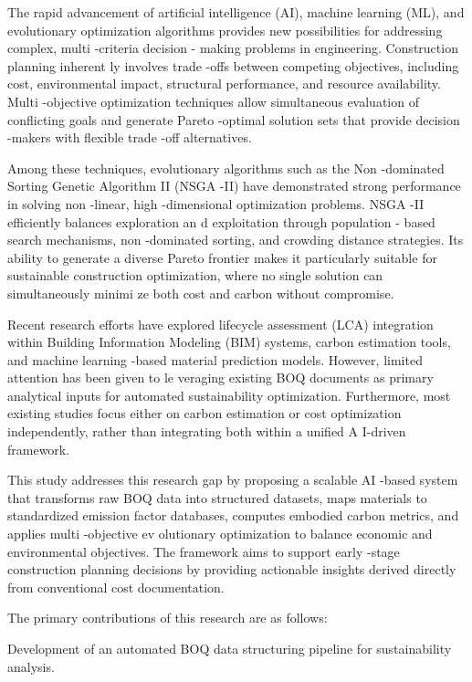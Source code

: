 \documentclass[10pt,twocolumn]{article}
\begin{document}
The rapid advancement of artificial intelligence (AI), machine learning (ML), and evolutionary 
optimization algorithms provides new possibilities for addressing complex, multi -criteria decision -
making problems in engineering. Construction planning inherent ly involves trade -offs between 
competing objectives, including cost, environmental impact, structural performance, and resource 
availability. Multi -objective optimization techniques allow simultaneous evaluation of conflicting 
goals and generate Pareto -optimal solution sets that provide decision -makers with flexible trade -off 
alternatives.  
 
Among these techniques, evolutionary algorithms such as the Non -dominated Sorting Genetic 
Algorithm II (NSGA -II) have demonstrated strong performance in solving non -linear, high -dimensional 
optimization problems. NSGA -II efficiently balances exploration an d exploitation through population -
based search mechanisms, non -dominated sorting, and crowding distance strategies. Its ability to 
generate a diverse Pareto frontier makes it particularly suitable for sustainable construction 
optimization, where no single solution can simultaneously minimi ze both cost and carbon without 
compromise.  
 
Recent research efforts have explored lifecycle assessment (LCA) integration within Building 
Information Modeling (BIM) systems, carbon estimation tools, and machine learning -based material 
prediction models. However, limited attention has been given to le veraging existing BOQ documents 
as primary analytical inputs for automated sustainability optimization. Furthermore, most existing 
studies focus either on carbon estimation or cost optimization independently, rather than integrating 
both within a unified A I-driven framework.  
 
This study addresses this research gap by proposing a scalable AI -based system that transforms raw 
BOQ data into structured datasets, maps materials to standardized emission factor databases, 
computes embodied carbon metrics, and applies multi -objective ev olutionary optimization to 
balance economic and environmental objectives. The framework aims to support early -stage 
construction planning decisions by providing actionable insights derived directly from conventional 
cost documentation.  
 
The primary contributions of this research are as follows:  
 
Development of an automated BOQ data structuring pipeline for sustainability analysis.  
 
\end{document}
